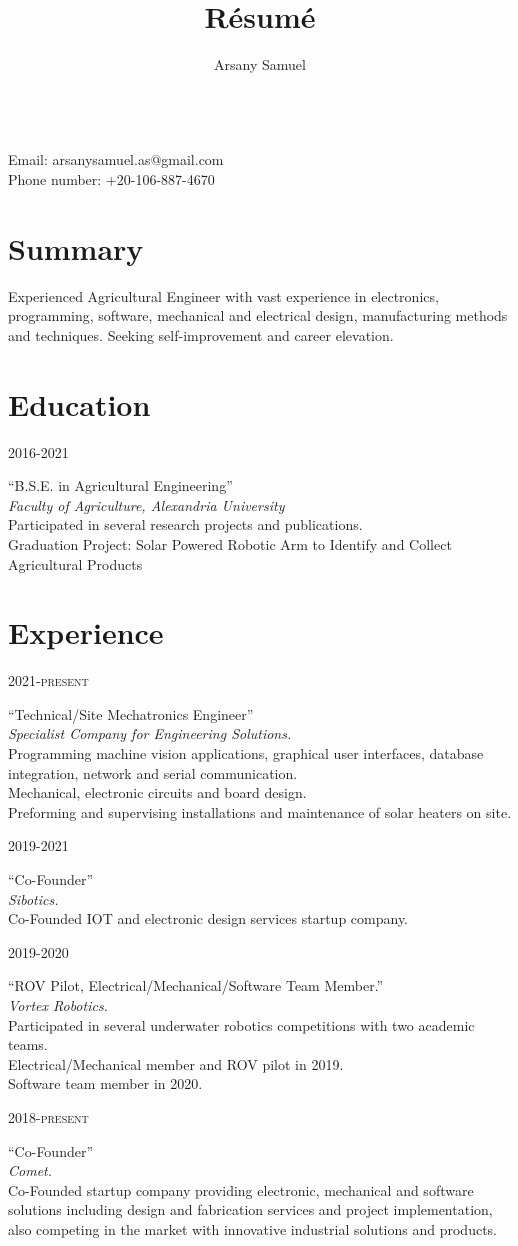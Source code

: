 \documentclass[a4paper]{article}
\title{R\'esum\'e}
\author{Arsany Samuel}
\makeatletter
\renewcommand{\maketitle}{
	\begin{center}
		{\Huge\bfseries{\theauthor}}\\
		\vspace{0.5em}
		{\large Email: arsanysamuel.as@gmail.com \\ Phone number: +20-106-887-4670}
	\end{center}
}
\newcommand{\ag}{Agricultural Engineering}
\newcommand{\foa}{Faculty of Agriculture}
\newcommand{\au}{Alexandria University}
\newcommand{\entry}[4]{   %
	\begin{center}
		\begin{minipage}[c]{0.25\linewidth}  %
			\vfill
			\hfill  %
			\textsc{#1}  %
			\vfill
		\end{minipage}
		\hfill\vline\hfill  %
		\begin{minipage}[c]{0.7\linewidth}
			\textrm{``#2''} \\
			\textit{#3} \\
			\footnotesize{#4}
		\end{minipage}
	\end{center}
}
\makeatother
\begin{document}
	\maketitle
	
	\section{Summary}
		Experienced Agricultural Engineer with vast experience in electronics, programming, software, mechanical and electrical design, manufacturing methods and techniques. Seeking self-improvement and career elevation.


	\section{Education}
		\entry{2016-2021}
			{B.S.E. in \ag}
			{\foa, \au }
			{Participated in several research projects and publications.\\Graduation Project: Solar Powered Robotic Arm to Identify and Collect \\Agricultural Products}


	\section{Experience}
		\entry{2021-present}
			{Technical/Site Mechatronics Engineer}
			{Specialist Company for Engineering Solutions.}
			{Programming machine vision applications, graphical user interfaces, database integration, network and serial communication.\\Mechanical, electronic circuits and board design.\\Preforming and supervising installations and maintenance of solar heaters on site.}
		\entry{2019-2021}
			{Co-Founder}
			{Sibotics.}
			{Co-Founded IOT and electronic design services startup company.}
		\entry{2019-2020}
			{ROV Pilot, Electrical/Mechanical/Software Team Member.}
			{Vortex Robotics.}
			{Participated in several underwater robotics competitions with two academic teams.\\Electrical/Mechanical member and ROV pilot in 2019.\\Software team member in 2020.}
		\entry{2018-present}  %
			{Co-Founder}
			{Comet.}
			{Co-Founded startup company providing electronic, mechanical and software solutions including design and fabrication services and project implementation, also competing in the market with innovative industrial solutions and products.}
\end{document}
